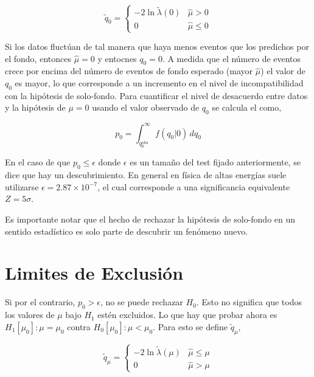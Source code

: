 \begin{equation}
  \tilde{q}_0 =
  \begin{cases}
    -2 \ln \tilde{\lambda}(0) & \hat{\mu} > 0 \\ 0 & \hat{\mu} \leq 0
  \end{cases}
\end{equation}

Si los datos fluctúan de tal manera que haya menos eventos que los predichos por
el fondo, entonces $\hat{\mu} = 0$ y entocnes $q_0=0$. A medida que el número de
eventos crece por encima del número de eventos de fondo esperado (mayor
$\hat{\mu}$) el valor de $q_0$ es mayor, lo que corresponde a un incremento en
el nivel de incompatibilidad con la hipótesis de solo-fondo. Para cuantificar el
nivel de desacuerdo entre datos y la hipótesis de $\mu=0$ usando el valor
observado de $q_0$ se calcula el {\pvalue} como,

\begin{equation}
  p_0 = \int_{q_{0}^\text{obs}}^{\infty} f(q_0|0) \, dq_0
  \label{eq:p0}
\end{equation}

En el caso de que $p_0 \leq \epsilon$ donde $\epsilon$ es un tamaño del test
fijado anteriormente, se dice que hay un descubrimiento. En general en física de
altas energías suele utilizarse $\epsilon = 2.87 \times 10^{-7}$, el cual corresponde
a una significancia equivalente $Z=5\sigma$.

Es importante notar que el hecho de rechazar la hipótesis de solo-fondo en
un sentido estadístico es solo parte de descubrir un fenómeno nuevo. 


\section{Limites de Exclusión}

Si por el contrario, $p_0> \epsilon$, no se puede rechazar $H_0$. Esto no
significa que todos los valores de $\mu$ bajo $H_1$ estén excluidos. Lo que hay
que probar ahora es $H_1[\mu_0]: \mu = \mu_0$ contra $H_0[\mu_0]: \mu < \mu_0$.
Para esto se define $\tilde{q}_\mu$,

\begin{equation}
  \tilde{q}_\mu =
  \begin{cases}
    -2 \ln \tilde{\lambda}(\mu) & \hat{\mu} \leq \mu \\ 0 & \hat{\mu} > \mu
  \end{cases} \label{eq:qmu}
\end{equation}

